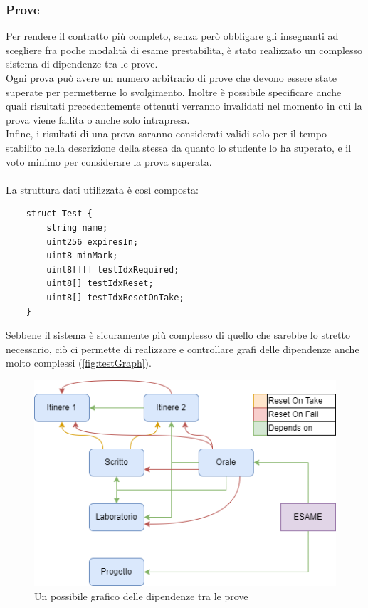 \subsubsection{Prove}
Per rendere il contratto più completo, senza però obbligare gli insegnanti ad scegliere fra poche modalità di esame prestabilita,
è stato realizzato un complesso sistema di dipendenze tra le prove. \\
Ogni prova può avere un numero arbitrario di prove che devono essere state superate per permetterne lo svolgimento.
Inoltre è possibile specificare anche quali risultati precedentemente ottenuti verranno invalidati
nel momento in cui la prova viene fallita o anche solo intrapresa. \\
Infine, i risultati di una prova saranno considerati validi solo per il tempo stabilito nella descrizione della stessa
da quanto lo studente lo ha superato, e il voto minimo per considerare la prova superata. \\
\\
La struttura dati utilizzata è così composta:
\begin{verbatim}
    struct Test {
        string name;
        uint256 expiresIn;
        uint8 minMark;
        uint8[][] testIdxRequired;
        uint8[] testIdxReset;
        uint8[] testIdxResetOnTake;
    }
\end{verbatim}

Sebbene il sistema è sicuramente più complesso di quello che sarebbe lo stretto necessario,
ciò ci permette di realizzare e controllare grafi delle dipendenze anche molto complessi (\autoref{fig:testGraph}).


\begin{figure}
    \centering
    \includegraphics[width=0.75\columnwidth,keepaspectratio]{img/TestGraph.png}
    \caption{Un possibile grafico delle dipendenze tra le prove}
    \label{fig:testGraph}
\end{figure}

